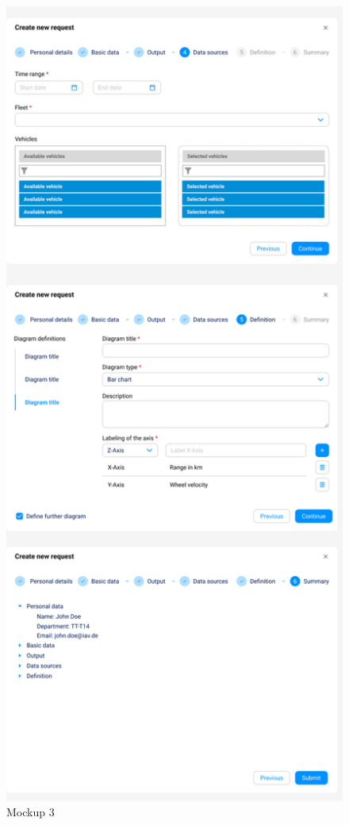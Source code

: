 \begin{figure}[H]
    \centering
    \includegraphics[scale=.39]{media/MockUps3.0_2.png}
    \caption{Mockup 3}
    \label{fig: MockUps3.0_2}
\end{figure}
\label{chap:anhang_a}



